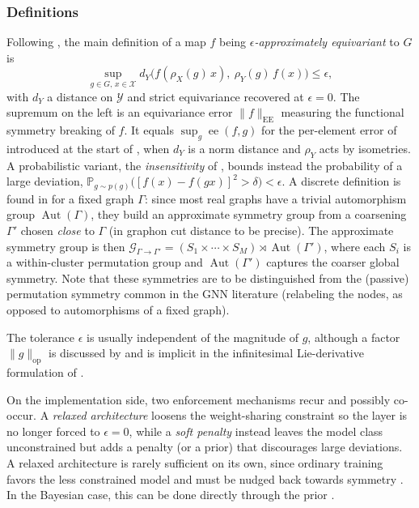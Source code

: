 \documentclass[mathematics,review,submit,moreauthors]{Definitions/mdpi}
\begin{document}
\subsubsection{Definitions}\label{sec:approx-definitions}
Following \citep{wang2022p3icml,sipiran202523scgpis,ali2026}, the main definition of a map $f$ being \emph{$\epsilon$-approximately equivariant} to $G$ is
\begin{equation}\label{eq:equiv-error-approximate}
    \sup_{g\in G,\,x\in \mathcal{X}} d_Y\big(f(\rho_X(g)\,x),\ \rho_Y(g)\,f(x)\big)\le \epsilon,
\end{equation}
with $d_Y$ a distance on $\mathcal{Y}$ and strict equivariance recovered at $\epsilon=0$.
The supremum on the left is an equivariance error $\|f\|_{\mathrm{EE}}$ measuring the functional symmetry breaking of $f$.
It equals $\sup_{g}\operatorname{ee}(f,g)$ for the per-element error of \citet{petrache2023} introduced at the start of , when $d_Y$ is a norm distance and $\rho_Y$ acts by isometries.
A probabilistic variant, the \emph{insensitivity} of \citet{vanderwilk2018anips}, bounds instead the probability of a large deviation, $\mathbb{P}_{g\sim p(g)}\big([f(x)-f(gx)]^2>\delta\big)<\epsilon$.
A discrete definition is found in \citet{huang2023} for a fixed graph $\Gamma$: since most real graphs have a trivial automorphism group $\operatorname{Aut}(\Gamma)$, they build an approximate symmetry group from a coarsening $\Gamma'$ chosen \textit{close} to $\Gamma$ (in graphon cut distance to be precise).
The approximate symmetry group is then $\mathcal{G}_{\Gamma\to\Gamma'}=(S_1\times\cdots\times S_M)\rtimes\operatorname{Aut}(\Gamma')$, where each $S_i$ is a within-cluster permutation group and $\operatorname{Aut}(\Gamma')$ captures the coarser global symmetry.
Note that these symmetries are to be distinguished from the (passive) permutation symmetry common in the GNN literature (relabeling the nodes, as opposed to automorphisms of a fixed graph).

\begin{Remark}
    The tolerance $\epsilon$ is usually independent of the magnitude of $g$, although a factor $\|g\|_{\mathrm{op}}$ is discussed by \citet{wang2022p3icml} and is implicit in the infinitesimal Lie-derivative formulation of \citet{pertigkiozoglou2024}.
\end{Remark}

On the implementation side, two enforcement mechanisms recur and possibly co-occur.
A \emph{relaxed architecture} loosens the weight-sharing constraint so the layer is no longer forced to $\epsilon=0$, while a \emph{soft penalty} instead leaves the model class unconstrained but adds a penalty (or a prior) that discourages large deviations.
A relaxed architecture is rarely sufficient on its own, since ordinary training favors the less constrained model and must be nudged back towards symmetry \citep{ouderaa2022,wang2022p3icml}.
In the Bayesian case, this can be done directly through the prior \citep{vanderwilk2018anips,ouderaa2023}.
\end{document}

